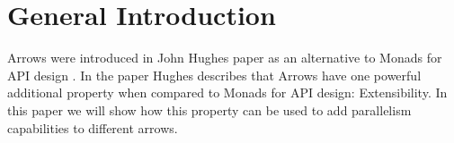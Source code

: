 \section{General Introduction}
Arrows were introduced in John Hughes paper as an alternative to Monads for API design \citHughes. In the paper Hughes describes that Arrows have one powerful additional property when compared to Monads for API design: Extensibility. In this paper we will show how this property can be used to add parallelism capabilities to different arrows.

